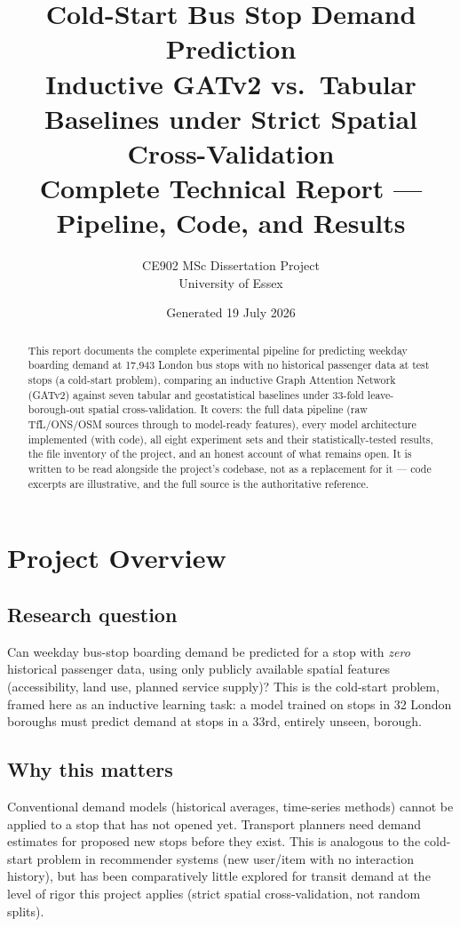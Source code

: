 \documentclass[11pt]{article}
\title{\Huge Cold-Start Bus Stop Demand Prediction\\[0.3em]
\Large Inductive GATv2 vs.\ Tabular Baselines under Strict Spatial Cross-Validation\\[0.6em]
\large Complete Technical Report --- Pipeline, Code, and Results}
\author{CE902 MSc Dissertation Project \\ University of Essex}
\date{Generated 19 July 2026}
\let\oldsection\section
\renewcommand{\section}[1]{\clearpage\oldsection{\color{sectcolor}#1}}
\let\oldsubsection\subsection
\renewcommand{\subsection}[1]{\oldsubsection{\color{sectcolor}#1}}
\begin{document}
\maketitle
\thispagestyle{empty}

\begin{abstract}
\noindent This report documents the complete experimental pipeline for predicting weekday
boarding demand at 17{,}943 London bus stops with no historical passenger data at test
stops (a cold-start problem), comparing an inductive Graph Attention Network (GATv2) against
seven tabular and geostatistical baselines under 33-fold leave-borough-out spatial
cross-validation. It covers: the full data pipeline (raw TfL/ONS/OSM sources through to
model-ready features), every model architecture implemented (with code), all eight
experiment sets and their statistically-tested results, the file inventory of the project,
and an honest account of what remains open. It is written to be read alongside the project's
codebase, not as a replacement for it --- code excerpts are illustrative, and the full source
is the authoritative reference.
\end{abstract}

\tableofcontents
\newpage

\section{Project Overview}

\subsection{Research question}
Can weekday bus-stop boarding demand be predicted for a stop with \emph{zero} historical
passenger data, using only publicly available spatial features (accessibility, land use,
planned service supply)? This is the cold-start problem, framed here as an inductive
learning task: a model trained on stops in 32 London boroughs must predict demand at stops
in a 33rd, entirely unseen, borough.

\subsection{Why this matters}
Conventional demand models (historical averages, time-series methods) cannot be applied to
a stop that has not opened yet. Transport planners need demand estimates for proposed new
stops before they exist. This is analogous to the cold-start problem in recommender systems
(new user/item with no interaction history), but has been comparatively little explored for
transit demand at the level of rigor this project applies (strict spatial cross-validation,
not random splits).
\end{document}
